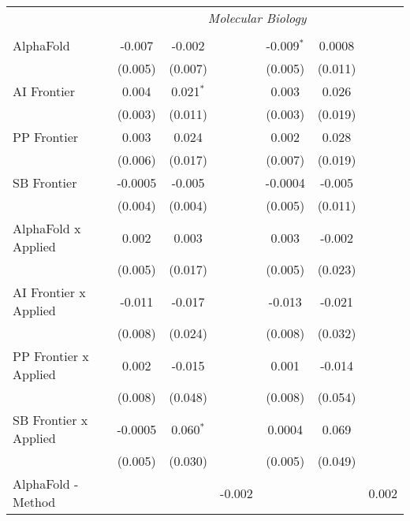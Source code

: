 \begin{tabular}{lcccccc}
 & \multicolumn{6}{c}{\textit{Molecular Biology}} \\ \\
   AlphaFold                      & -0.007  & -0.002      &                & -0.009$^{*}$ & 0.0008  &   \\   
                                  & (0.005) & (0.007)     &                & (0.005)      & (0.011) &   \\   
   AI Frontier                    & 0.004   & 0.021$^{*}$ &                & 0.003        & 0.026   &   \\   
                                  & (0.003) & (0.011)     &                & (0.003)      & (0.019) &   \\   
   PP Frontier                    & 0.003   & 0.024       &                & 0.002        & 0.028   &   \\   
                                  & (0.006) & (0.017)     &                & (0.007)      & (0.019) &   \\   
   SB Frontier                    & -0.0005 & -0.005      &                & -0.0004      & -0.005  &   \\   
                                  & (0.004) & (0.004)     &                & (0.005)      & (0.011) &   \\   
   AlphaFold x Applied            & 0.002   & 0.003       &                & 0.003        & -0.002  &   \\   
                                  & (0.005) & (0.017)     &                & (0.005)      & (0.023) &   \\   
   AI Frontier x Applied          & -0.011  & -0.017      &                & -0.013       & -0.021  &   \\   
                                  & (0.008) & (0.024)     &                & (0.008)      & (0.032) &   \\   
   PP Frontier x Applied          & 0.002   & -0.015      &                & 0.001        & -0.014  &   \\   
                                  & (0.008) & (0.048)     &                & (0.008)      & (0.054) &   \\   
   SB Frontier x Applied          & -0.0005 & 0.060$^{*}$ &                & 0.0004       & 0.069   &   \\   
                                  & (0.005) & (0.030)     &                & (0.005)      & (0.049) &   \\   
   AlphaFold - Method             &         &             & -0.002         &              &         & 0.002\\   

\end{tabular}
